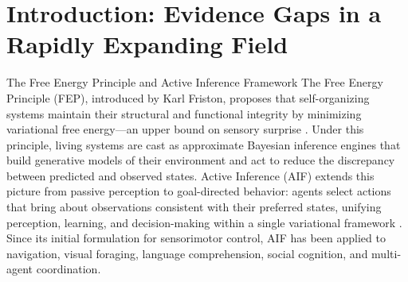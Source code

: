 \documentclass[
  ignorenonframetext,
]{beamer}
\author{\texorpdfstring{}{}}
\date{}
\begin{document}
\section{Introduction: Evidence Gaps in a Rapidly Expanding
Field}\label{introduction-evidence-gaps-in-a-rapidly-expanding-field}

\begin{frame}{The Free Energy Principle and Active Inference Framework}
\protect{}\label{the-free-energy-principle-and-active-inference-framework}
The Free Energy Principle (FEP), introduced by Karl Friston, proposes
that self-organizing systems maintain their structural and functional
integrity by minimizing variational free energy---an upper bound on
sensory surprise \citep{friston2006free, friston2010free}. Under this
principle, living systems are cast as approximate Bayesian inference
engines that build generative models of their environment and act to
reduce the discrepancy between predicted and observed states. Active
Inference (AIF) extends this picture from passive perception to
goal-directed behavior: agents select actions that bring about
observations consistent with their preferred states, unifying
perception, learning, and decision-making within a single variational
framework \citep{parr2022active, friston2017active}. Since its initial
formulation for sensorimotor control, AIF has been applied to
navigation, visual foraging, language comprehension, social cognition,
and multi-agent coordination.
\end{frame}
\end{document}
